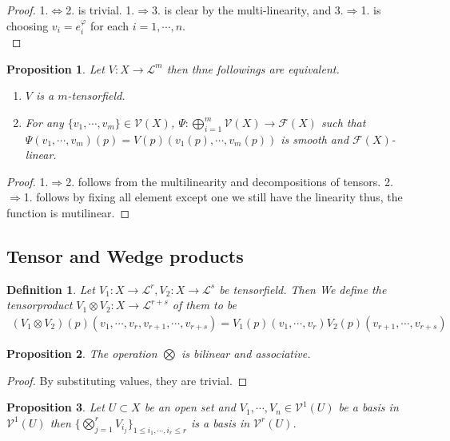 \documentclass{article}
\newtheorem{proposition}{Proposition}[section]
\newtheorem{definition}{Definition}[section]
\numberwithin{equation}{section}
\begin{document}
\begin{proof}
1.$\Leftrightarrow$2. is trivial. 1.$\Rightarrow$3. is clear by the multi-linearity, and 3.$\Rightarrow$1. is choosing $v_i=e_i^\varphi$ for each $i=1,\cdots,n$.\\
\end{proof}
\begin{proposition}
Let $V:X\to\mathcal{L}^m$ then thne followings are equivalent. 
\begin{enumerate}
\item $V$ is a $m$-tensorfield.
\item For any $\{v_1,\cdots,v_m\}\in\mathcal{V}(X)$, $\Psi:\bigoplus_{i=1}^m\mathcal{V}(X)\to\mathcal{F}(X)$ such that $\Psi(v_1,\cdots,v_m)(p)=V(p)(v_1(p),\cdots,v_m(p))$ is smooth and $\mathcal{F}(X)$-linear.
\end{enumerate}
\end{proposition}

\begin{proof}
1.$\Rightarrow$2. follows from the multilinearity and decompositions of tensors. 2.$\Rightarrow$1. follows by fixing all element except one we still have the linearity thus, the function is mutilinear. 
\end{proof}


\subsection{Tensor and Wedge products}

\begin{definition}
Let $V_1:X\to\mathcal{L}^r,V_2:X\to\mathcal{L}^s$ be tensorfield. Then We define the tensorproduct $V_1\otimes V_2:X\to\mathcal{L}^{r+s}$ of them to be
\begin{align*}
 (V_1\otimes V_2)(p)(v_1,\cdots, v_r,v_{r+1},\cdots,v_{r+s}) = V_1(p)(v_1,\cdots,v_r)V_2(p)(v_{r+1},\cdots,v_{r+s})
\end{align*}
\end{definition}

\begin{proposition}
The operation $\bigotimes$ is bilinear and associative.
\end{proposition}

\begin{proof}
By substituting values, they are trivial.
\end{proof}

\begin{proposition}
Let $U\subset X$ be an open set and $V_1,\cdots,V_n\in\mathcal{V}^1(U)$ be a basis in $\mathcal{V}^1(U)$ then $\{\bigotimes_{j=1}^rV_{i_j}\}_{1\leq i_1,\cdots,i_r\leq r}$ is a basis in $\mathcal{V}^r(U)$.
\end{proposition}
\end{document}
